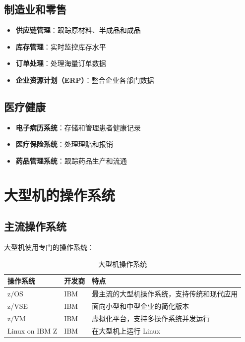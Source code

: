 \documentclass[12pt,UTF8]{ctexbook}
\begin{document}
\section{制造业和零售}

\begin{itemize}[leftmargin=2cm]
    \item \textbf{供应链管理}：跟踪原材料、半成品和成品
    \item \textbf{库存管理}：实时监控库存水平
    \item \textbf{订单处理}：处理海量订单数据
    \item \textbf{企业资源计划（ERP）}：整合企业各部门数据
\end{itemize}

\section{医疗健康}

\begin{itemize}[leftmargin=2cm]
    \item \textbf{电子病历系统}：存储和管理患者健康记录
    \item \textbf{医疗保险系统}：处理理赔和报销
    \item \textbf{药品管理系统}：跟踪药品生产和流通
\end{itemize}

\chapter{大型机的操作系统}
\label{chap:os}

\section{主流操作系统}

大型机使用专门的操作系统：

\begin{table}[htbp]
    \centering
    \caption{大型机操作系统}
    \begin{tabular}{|p{3cm}|p{3cm}|p{4cm}|}
        \hline
        \textbf{操作系统} & \textbf{开发商} & \textbf{特点} \\
        \hline
        z/OS & IBM & 最主流的大型机操作系统，支持传统和现代应用 \\
        \hline
        z/VSE & IBM & 面向小型和中型企业的简化版本 \\
        \hline
        z/VM & IBM & 虚拟化平台，支持多操作系统并发运行 \\
        \hline
        Linux on IBM Z & IBM & 在大型机上运行 Linux \\
        \hline
    \end{tabular}
\end{table}
\end{document}

